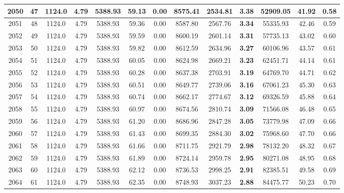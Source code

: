 {\begin{center}
\begin{tabular}[htb]{|c|c||c|c|c|c|c|c||c|c||c|c|c||}
\hline 
 2050 &  47 &  1124.0 &  4.79 &  5388.93 &  59.13 &  0.00 &  8575.41 &  2534.81 &  {\bf 3.38} &  52909.05 &  41.92 &  0.58 \\ 
\hline 
 2051 &  48 &  1124.0 &  4.79 &  5388.93 &  59.36 &  0.00 &  8587.80 &  2567.76 &  {\bf 3.34} &  55335.93 &  42.46 &  0.59 \\ 
\hline 
 2052 &  49 &  1124.0 &  4.79 &  5388.93 &  59.59 &  0.00 &  8600.19 &  2601.14 &  {\bf 3.31} &  57735.13 &  43.02 &  0.60 \\ 
\hline 
 2053 &  50 &  1124.0 &  4.79 &  5388.93 &  59.82 &  0.00 &  8612.59 &  2634.96 &  {\bf 3.27} &  60106.96 &  43.57 &  0.61 \\ 
\hline 
 2054 &  51 &  1124.0 &  4.79 &  5388.93 &  60.05 &  0.00 &  8624.98 &  2669.21 &  {\bf 3.23} &  62451.71 &  44.14 &  0.61 \\ 
\hline 
 2055 &  52 &  1124.0 &  4.79 &  5388.93 &  60.28 &  0.00 &  8637.38 &  2703.91 &  {\bf 3.19} &  64769.70 &  44.71 &  0.62 \\ 
\hline 
 2056 &  53 &  1124.0 &  4.79 &  5388.93 &  60.51 &  0.00 &  8649.77 &  2739.06 &  {\bf 3.16} &  67061.23 &  45.30 &  0.63 \\ 
\hline 
 2057 &  54 &  1124.0 &  4.79 &  5388.93 &  60.74 &  0.00 &  8662.17 &  2774.67 &  {\bf 3.12} &  69326.59 &  45.88 &  0.64 \\ 
\hline 
 2058 &  55 &  1124.0 &  4.79 &  5388.93 &  60.97 &  0.00 &  8674.56 &  2810.74 &  {\bf 3.09} &  71566.08 &  46.48 &  0.65 \\ 
\hline 
 2059 &  56 &  1124.0 &  4.79 &  5388.93 &  61.20 &  0.00 &  8686.96 &  2847.28 &  {\bf 3.05} &  73779.98 &  47.09 &  0.66 \\ 
\hline 
 2060 &  57 &  1124.0 &  4.79 &  5388.93 &  61.43 &  0.00 &  8699.35 &  2884.30 &  {\bf 3.02} &  75968.60 &  47.70 &  0.66 \\ 
\hline 
 2061 &  58 &  1124.0 &  4.79 &  5388.93 &  61.66 &  0.00 &  8711.75 &  2921.79 &  {\bf 2.98} &  78132.20 &  48.32 &  0.67 \\ 
\hline 
 2062 &  59 &  1124.0 &  4.79 &  5388.93 &  61.89 &  0.00 &  8724.14 &  2959.78 &  {\bf 2.95} &  80271.08 &  48.95 &  0.68 \\ 
\hline 
 2063 &  60 &  1124.0 &  4.79 &  5388.93 &  62.12 &  0.00 &  8736.53 &  2998.25 &  {\bf 2.91} &  82385.51 &  49.58 &  0.69 \\ 
\hline 
 2064 &  61 &  1124.0 &  4.79 &  5388.93 &  62.35 &  0.00 &  8748.93 &  3037.23 &  {\bf 2.88} &  84475.77 &  50.23 &  0.70 \\ 

\end{tabular}
\end{center}}
